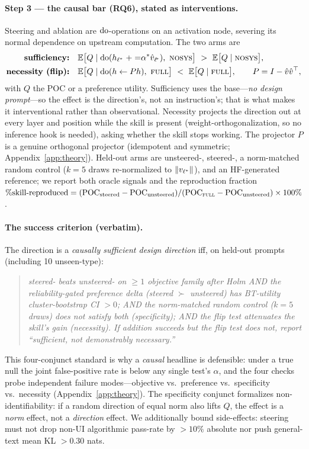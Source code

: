 \paragraph{Step 3 --- the causal bar (RQ6), stated as interventions.} Steering and ablation are
$\operatorname{do}$-operations on an activation node, severing its normal dependence on upstream computation.
The two arms are
\begin{align}
\textbf{sufficiency:}\quad&
\mathbb{E}\big[Q\mid \operatorname{do}(h_{\ell^{*}}\mathrel{+}{=}\alpha^{*}\hat{v}_{\ell^{\!*}}),\ \textsc{nosys}\big]\ >\ \mathbb{E}\big[Q\mid \textsc{nosys}\big],
\label{eq:suff}\\
\textbf{necessity (flip):}\quad&
\mathbb{E}\big[Q\mid \operatorname{do}(h\leftarrow Ph),\ \textsc{full}\big]\ <\ \mathbb{E}\big[Q\mid \textsc{full}\big],\qquad P=I-\hat{v}\hat{v}^{\top},
\label{eq:flip}
\end{align}
with $Q$ the POC or a preference utility. Sufficiency uses the \NOSYS{} base---\emph{no design
prompt}---so the effect is the direction's, not an instruction's; that is what makes it interventional
rather than observational. Necessity projects the direction out at every layer and position while the
skill is present (weight-orthogonalization, so no inference hook is needed), asking whether the skill
stops working. The projector $P$ is a genuine orthogonal projector (idempotent and symmetric;
Appendix~\ref{app:theory}). Held-out arms are unsteered-\NOSYS, steered-\NOSYS, a norm-matched random
control ($k{=}5$ draws re-normalized to $\lVert v_{\ell^{*}}\rVert$), and an HF-generated \FULL{}
reference; we report both oracle signals and the reproduction fraction $\%\text{skill-reproduced}=
(\mathrm{POC}_{\text{steered}}-\mathrm{POC}_{\text{unsteered}})/(\mathrm{POC}_{\textsc{full}}-\mathrm{POC}_{\text{unsteered}})\times100\%$.

\paragraph{The success criterion (verbatim).} The direction is a \emph{causally sufficient design
direction} iff, on held-out prompts (including 10 unseen-type):
\begin{quote}\itshape
steered-\NOSYS{} beats unsteered-\NOSYS{} on $\ge1$ objective family after Holm AND the
reliability-gated preference delta (steered $\succ$ unsteered) has BT-utility cluster-bootstrap CI
$>0$; AND the norm-matched random control ($k{=}5$ draws) does not satisfy both (specificity); AND
the flip test attenuates the skill's gain (necessity). If addition succeeds but the flip test does
not, report ``sufficient, not demonstrably necessary.''
\end{quote}
This four-conjunct standard is why a \emph{causal} headline is defensible: under a true null the joint
false-positive rate is below any single test's $\alpha$, and the four checks probe independent failure
modes---objective vs.\ preference vs.\ specificity vs.\ necessity (Appendix~\ref{app:theory}). The
specificity conjunct formalizes non-identifiability: if a random direction of equal norm also lifts
$Q$, the effect is a \emph{norm} effect, not a \emph{direction} effect. We additionally bound
side-effects: steering must not drop non-UI algorithmic pass-rate by $>10\%$ absolute nor push
general-text mean KL $>0.30$ nats.

